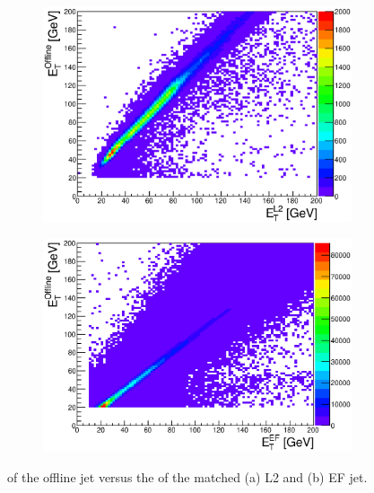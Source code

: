 \begin{figure}
\centering
        \begin{subfigure}[b]{0.5\textwidth}
                \centering
                \includegraphics[width=\textwidth]{figures/ServiceWork/Jets/L2_EtEtMatchedJet.eps}
        \end{subfigure}%
        \begin{subfigure}[b]{0.5\textwidth}
                \centering
                \includegraphics[width=\textwidth]{figures/ServiceWork/Jets/EF_EtEtMatchedJet.eps}
        \end{subfigure}%
\caption[Offline jet \et{} versus L2/EF jet \et{}]{
\et{} of the offline jet versus the \et{} of the matched (a) L2 and (b) EF jet.
\label{SW_jet_L2EF_EtEt}}
\end{figure}


